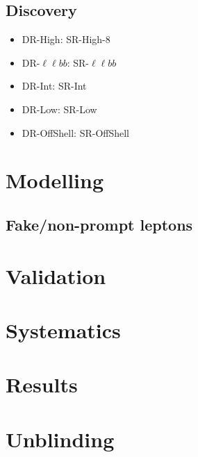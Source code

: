 \subsection{Discovery}
\label{sec:2ljets_disco}

\begin{itemize}
\item DR-High: SR-High-8
\item DR-$\ell\ell bb$: SR-$\ell\ell bb$
\item DR-Int: SR-Int
\item DR-Low: SR-Low
\item DR-OffShell: SR-OffShell
\end{itemize}

\section{Modelling}

\subsection{Fake/non-prompt leptons}
\label{sec:2ljets_mm_fakes}

\section{Validation}

\section{Systematics}

\section{Results}

\section{Unblinding}
